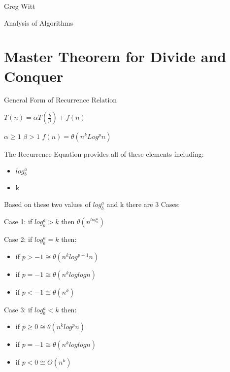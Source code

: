 \documentclass[a4paper,12pt]{article}
\begin{document}
Greg Witt

Analysis of Algorithms

\section*{Master Theorem for Divide and Conquer  }







General Form of Recurrence Relation

\vspace{5mm}

$T(n) = \alpha T(\frac{b}{\beta}) + f(n)$

\vspace{5mm}
$\alpha \geq 1$  
$\beta > 1$   $f(n) = \theta(n^kLog^pn)$

\vspace{5mm}

The Recurrence Equation provides all of these elements including: 

\begin{itemize}

	\item $log^a_b$
	\item k
\end{itemize}

Based on these two values of $log^a_b$ and k there are 3 Cases:

\vspace{5mm}
Case 1: if $log^a_b > k$ then $\theta(n^{log^a_b})$

\vspace{5mm}
Case 2:  if $log^a_b = k$ then:
	\begin{itemize}
		\item if $p > -1 \cong \theta(n^klog^{p+1}n)$
		\item if $p =-1 \cong \theta(n^{k}loglogn)$
		\item if $p < -1 \cong \theta(n^{k})$
	\end{itemize}
	
\vspace{5mm}
Case 3: if $log^a_b < k$ then:
	\begin{itemize}
		\item if $p \geq 0 \cong \theta(n^klog^{p}n)$
		\item if $p =-1 \cong \theta(n^{k}loglogn)$
		\item if $p < 0 \cong O(n^{k})$
	\end{itemize}
\end{document}
